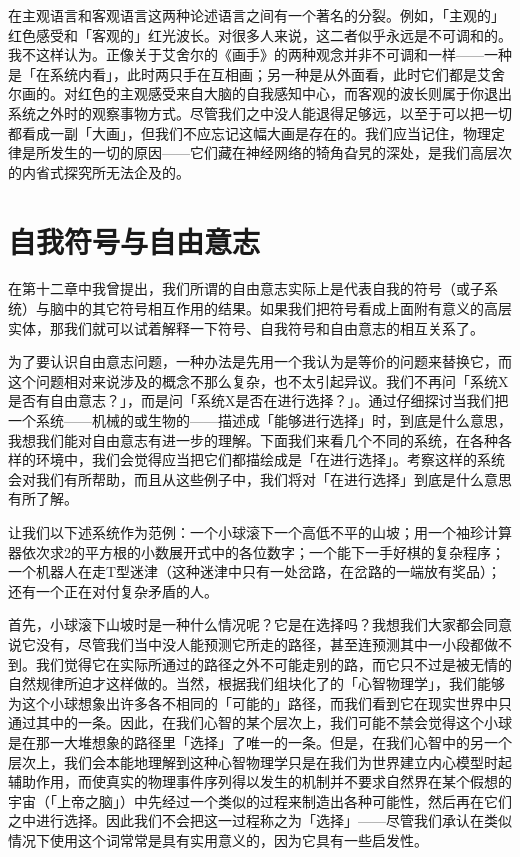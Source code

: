 \documentclass[
  12pt,
  twoside,
  openright,
  oldfontcommands,
]{memoir}
\begin{document}
在主观语言和客观语言这两种论述语言之间有一个著名的分裂。例如，「主观的」红色感受和「客观的」红光波长。对很多人来说，这二者似乎永远是不可调和的。我不这样认为。正像关于艾舍尔的《画手》的两种观念并非不可调和一样------一种是「在系统内看」，此时两只手在互相画；另一种是从外面看，此时它们都是艾舍尔画的。对红色的主观感受来自大脑的自我感知中心，而客观的波长则属于你退出系统之外时的观察事物方式。尽管我们之中没人能退得足够远，以至于可以把一切都看成一副「大画」，但我们不应忘记这幅大画是存在的。我们应当记住，物理定律是所发生的一切的原因------它们藏在神经网络的犄角旮旯的深处，是我们高层次的内省式探究所无法企及的。

\section{自我符号与自由意志}

在第十二章中我曾提出，我们所谓的自由意志实际上是代表自我的符号（或子系统）与脑中的其它符号相互作用的结果。如果我们把符号看成上面附有意义的高层实体，那我们就可以试着解释一下符号、自我符号和自由意志的相互关系了。

为了要认识自由意志问题，一种办法是先用一个我认为是等价的问题来替换它，而这个问题相对来说涉及的概念不那么复杂，也不太引起异议。我们不再问「系统X是否有自由意志？」，而是问「系统X是否在进行选择？」。通过仔细探讨当我们把一个系统------机械的或生物的------描述成「能够进行选择」时，到底是什么意思，我想我们能对自由意志有进一步的理解。下面我们来看几个不同的系统，在各种各样的环境中，我们会觉得应当把它们都描绘成是「在进行选择」。考察这样的系统会对我们有所帮助，而且从这些例子中，我们将对「在进行选择」到底是什么意思有所了解。

让我们以下述系统作为范例：一个小球滚下一个高低不平的山坡；用一个袖珍计算器依次求2的平方根的小数展开式中的各位数字；一个能下一手好棋的复杂程序；一个机器人在走T型迷津（这种迷津中只有一处岔路，在岔路的一端放有奖品）；还有一个正在对付复杂矛盾的人。

首先，小球滚下山坡时是一种什么情况呢？它是在选择吗？我想我们大家都会同意说它没有，尽管我们当中没人能预测它所走的路径，甚至连预测其中一小段都做不到。我们觉得它在实际所通过的路径之外不可能走别的路，而它只不过是被无情的自然规律所迫才这样做的。当然，根据我们组块化了的「心智物理学」，我们能够为这个小球想象出许多各不相同的「可能的」路径，而我们看到它在现实世界中只通过其中的一条。因此，在我们心智的某个层次上，我们可能不禁会觉得这个小球是在那一大堆想象的路径里「选择」了唯一的一条。但是，在我们心智中的另一个层次上，我们会本能地理解到这种心智物理学只是在我们为世界建立内心模型时起辅助作用，而使真实的物理事件序列得以发生的机制并不要求自然界在某个假想的宇宙（「上帝之脑」）中先经过一个类似的过程来制造出各种可能性，然后再在它们之中进行选择。因此我们不会把这一过程称之为「选择」------尽管我们承认在类似情况下使用这个词常常是具有实用意义的，因为它具有一些启发性。
\end{document}
